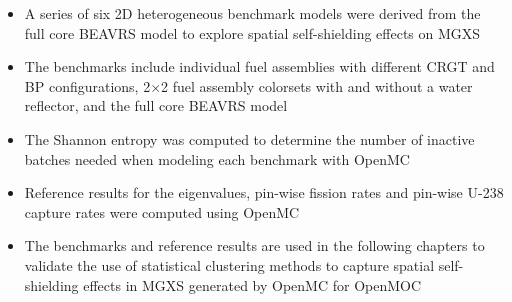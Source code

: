 
\clearpage

\vfill
\begin{highlightsbox}[frametitle=Highlights]
\begin{itemize}
  \item A series of six 2D heterogeneous benchmark models were derived from the full core \ac{BEAVRS} model to explore spatial self-shielding effects on \ac{MGXS}
  \item The benchmarks include individual fuel assemblies with different \ac{CRGT} and \ac{BP} configurations, 2$\times$2 fuel assembly colorsets with and without a water reflector, and the full core \ac{BEAVRS} model
  \item The Shannon entropy was computed to determine the number of inactive batches needed when modeling each benchmark with OpenMC
  \item Reference results for the eigenvalues, pin-wise fission rates and pin-wise U-238 capture rates were computed using OpenMC
  \item The benchmarks and reference results are used in the following chapters to validate the use of statistical clustering methods to capture spatial self-shielding effects in \ac{MGXS} generated by OpenMC for OpenMOC
\end{itemize}
\end{highlightsbox}
\vfill